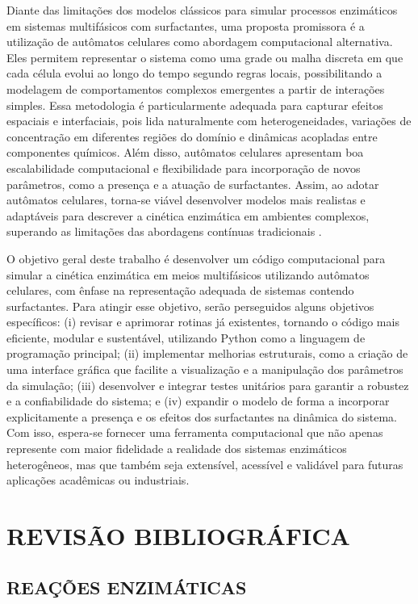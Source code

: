 \documentclass[12pt,oneside]{report}
\begin{document}
Diante das limitações dos modelos clássicos para simular processos enzimáticos em sistemas multifásicos com surfactantes, uma proposta promissora é a utilização de autômatos celulares como abordagem computacional alternativa. Eles permitem representar o sistema como uma grade ou malha discreta em que cada célula evolui ao longo do tempo segundo regras locais, possibilitando a modelagem de comportamentos complexos emergentes a partir de interações simples. Essa metodologia é particularmente adequada para capturar efeitos espaciais e interfaciais, pois lida naturalmente com heterogeneidades, variações de concentração em diferentes regiões do domínio e dinâmicas acopladas entre componentes químicos. Além disso, autômatos celulares apresentam boa escalabilidade computacional e flexibilidade para incorporação de novos parâmetros, como a presença e a atuação de surfactantes. Assim, ao adotar autômatos celulares, torna-se viável desenvolver modelos mais realistas e adaptáveis para descrever a cinética enzimática em ambientes complexos, superando as limitações das abordagens contínuas tradicionais \cite{kier2005}.

O objetivo geral deste trabalho é desenvolver um código computacional para simular a cinética enzimática em meios multifásicos utilizando autômatos celulares, com ênfase na representação adequada de sistemas contendo surfactantes. Para atingir esse objetivo, serão perseguidos alguns objetivos específicos: (i) revisar e aprimorar rotinas já existentes, tornando o código mais eficiente, modular e sustentável, utilizando Python como a linguagem de programação principal; (ii) implementar melhorias estruturais, como a criação de uma interface gráfica que facilite a visualização e a manipulação dos parâmetros da simulação; (iii) desenvolver e integrar testes unitários para garantir a robustez e a confiabilidade do sistema; e (iv) expandir o modelo de forma a incorporar explicitamente a presença e os efeitos dos surfactantes na dinâmica do sistema. Com isso, espera-se fornecer uma ferramenta computacional que não apenas represente com maior fidelidade a realidade dos sistemas enzimáticos heterogêneos, mas que também seja extensível, acessível e validável para futuras aplicações acadêmicas ou industriais.


\chapter{REVISÃO BIBLIOGRÁFICA}
\section{REAÇÕES ENZIMÁTICAS}
\end{document}
